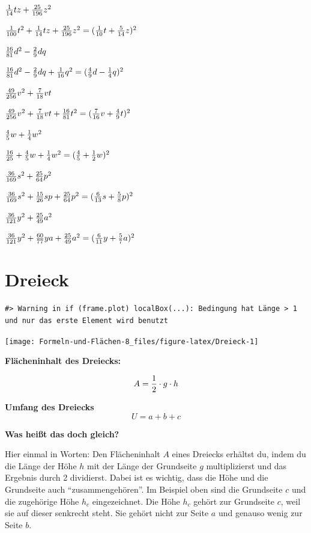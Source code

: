 \documentclass[
  ngerman,
]{book}
\begin{document}
\({1 \over 14}tz+{25 \over 196}z^2\)

\leavevmode\hypertarget{toggleText133}{}%
\({1 \over 100}t^2+{1 \over 14}tz+{25 \over 196}z^2=({1 \over 10}t+{5 \over 14}z)^2\)

\({16 \over 81}d^2-{2 \over 9}dq\)

\leavevmode\hypertarget{toggleText134}{}%
\({16 \over 81}d^2-{2 \over 9}dq+{1 \over 16}q^2=({4 \over 9}d-{1 \over 4}q)^2\)

\({49 \over 256}v^2+{7 \over 18}vt\)

\leavevmode\hypertarget{toggleText135}{}%
\({49 \over 256}v^2+{7 \over 18}vt+{16 \over 81}t^2=({7 \over 16}v+{4 \over 9}t)^2\)

\({4 \over 5}w+{1 \over 4}w^2\)

\leavevmode\hypertarget{toggleText136}{}%
\({16 \over 25}+{4 \over 5}w+{1 \over 4}w^2=({4 \over 5}+{1 \over 2}w)^2\)

\({36 \over 169}s^2+{25 \over 64}p^2\)

\leavevmode\hypertarget{toggleText137}{}%
\({36 \over 169}s^2+{15 \over 26}sp+{25 \over 64}p^2=({6 \over 13}s+{5 \over 8}p)^2\)

\({36 \over 121}y^2+{25 \over 49}a^2\)

\leavevmode\hypertarget{toggleText138}{}%
\({36 \over 121}y^2+{60 \over 77}ya+{25 \over 49}a^2=({6 \over 11}y+{5 \over 7}a)^2\)

\hypertarget{dreieck}{%
\chapter{Dreieck}\label{dreieck}}

\begin{verbatim}
#> Warning in if (frame.plot) localBox(...): Bedingung hat Länge > 1 und nur das erste Element wird benutzt
\end{verbatim}

\begin{center}\texttt{[image: Formeln-und-Flächen-8\_files/figure-latex/Dreieck-1]} \end{center}

\textbf{Flächeninhalt des Dreiecks:}

\[A = {1 \over 2} \cdot g \cdot h\]

\textbf{Umfang des Dreiecks}
\[U = a + b + c\]

\textbf{Was heißt das doch gleich?}

Hier einmal in Worten: Den Flächeninhalt \(A\) eines Dreiecks erhältst du, indem du die Länge der Höhe \(h\) mit der Länge der Grundseite \(g\) multiplizierst und das Ergebnis durch 2 dividierst. Dabei ist es wichtig, dass die Höhe und die Grundseite auch ``zusammengehören''. Im Beispiel oben sind die Grundseite \(c\) und die zugehörige Höhe \(h_c\) eingezeichnet. Die Höhe \(h_c\) gehört zur Grundseite \(c\), weil sie auf dieser senkrecht steht. Sie gehört nicht zur Seite \(a\) und genauso wenig zur Seite \(b\).
\end{document}

